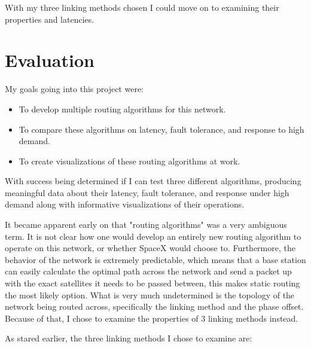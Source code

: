 \documentclass[12pt,a4paper,twoside,openright]{report}
\begin{document}
With my three linking methods chosen I could move on to examining their properties and latencies.

\chapter{Evaluation}

My goals going into this project were:

\begin{itemize}
\item To develop multiple routing algorithms for this network.
\item To compare these algorithms on latency, fault tolerance, and response to high demand.
\item To create visualizations of these routing algorithms at work.
\end{itemize}

With success being determined if I can test three different algorithms, producing meaningful data about their latency, fault tolerance, and response under high demand along with informative visualizations of their operations. 

It became apparent early on that "routing algorithms" was a very ambiguous term. It is not clear how one would develop an entirely new routing algorithm to operate on this network, or whether SpaceX would choose to. Furthermore, the behavior of the network is extremely predictable, which means that a base station can easily calculate the optimal path across the network and send a packet up with the exact satellites it needs to be passed between, this makes static routing the most likely option. What is very much undetermined is the topology of the network being routed across, specifically the linking method and the phase offset. Because of that, I chose to examine the properties of 3 linking methods instead.

As stared earlier, the three linking methods I chose to examine are:
\end{document}
